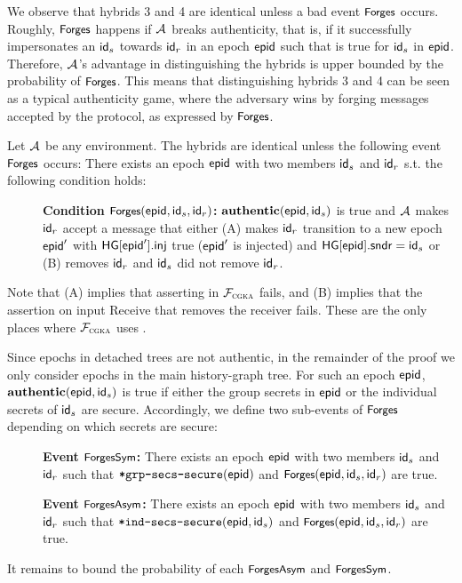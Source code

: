 We observe that hybrids 3 and 4 are identical unless a bad event $\forges$ occurs. Roughly, $\forges$ happens if $\Adv$ breaks authenticity, that is, if it successfully impersonates an $\id_s$ towards $\id_r$ in an epoch $\hgnodeid$ such that \KwAuth{} is true for $\id_s$ in $\hgnodeid$. Therefore, $\Adv$'s advantage in distinguishing the hybrids is upper bounded by the probability of $\forges$. This means that distinguishing hybrids 3 and 4 can be seen as a typical authenticity game, where the adversary wins by forging messages accepted by the protocol, as expressed by $\forges$.

Let $\Adv$ be any environment. The hybrids are identical unless the following event $\forges$ occurs: There exists an epoch $\hgnodeid$ with two members $\id_s$ and $\id_r$ s.t. the following condition holds:
\begin{description}
  \item[] {\bf Condition $\forges(\hgnodeid, \id_s, \id_r)$: } $\KwAuth{}(\hgnodeid, \id_s)$ is true and $\Adv$ makes $\id_r$ accept a message that either (A) makes $\id_r$ transition to a new epoch $\hgnodeid'$ with $\hg[\hgnodeid'].\hginj$ true ($\hgnodeid'$ is injected) and $\hg[\hgnodeid].\hgorig=\id_s$ or (B) removes $\id_r$ and $\id_s$ did not remove $\id_r$.
\end{description}
Note that (A) implies that asserting \authPreserved in $\funcCGKA$ fails, and (B) implies that the assertion on input Receive that removes the receiver fails. These are the only places where $\funcCGKA$ uses \KwAuth{}.

Since epochs in detached trees are not authentic, in the remainder of the proof we only consider epochs in the main history-graph tree. For such an epoch $\hgnodeid$, $\KwAuth{}(\hgnodeid, \id_s)$ is true if either the group secrets in $\hgnodeid$ or the individual secrets of $\id_s$ are secure. Accordingly, we define two sub-events of $\forges$ depending on which secrets are secure:
\begin{description}
  \item[] {\bf Event $\forgess$: } There exists an epoch $\hgnodeid$ with two members $\id_s$ and $\id_r$ such that $\safeGrpSecsSecure(\hgnodeid)$ and $\forges(\hgnodeid, \id_s, \id_r)$ are true.
  \item[] {\bf Event $\forgesa$: } There exists an epoch $\hgnodeid$ with two members $\id_s$ and $\id_r$ such that $\safeIndSecsSecure(\hgnodeid, \id_s)$ and $\forges(\hgnodeid, \id_s, \id_r)$ are true.
\end{description}
It remains to bound the probability of each $\forgesa$ and $\forgess$.

